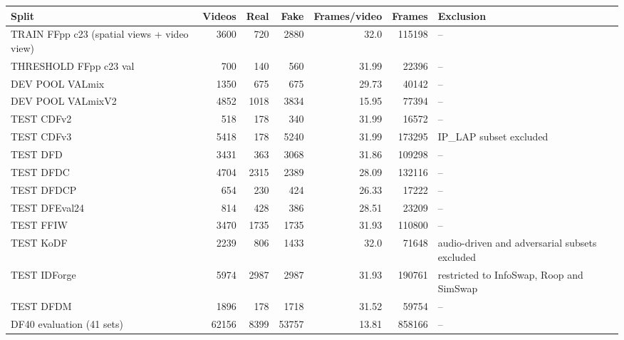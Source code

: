 \begin{tabular}{lrrrrrl}
\toprule
Split & Videos & Real & Fake & Frames/video & Frames & Exclusion \\
\midrule
TRAIN FFpp c23 (spatial views + video view) & 3600 & 720 & 2880 & 32.0 & 115198 & -- \\
THRESHOLD FFpp c23 val & 700 & 140 & 560 & 31.99 & 22396 & -- \\
DEV POOL VALmix & 1350 & 675 & 675 & 29.73 & 40142 & -- \\
DEV POOL VALmixV2 & 4852 & 1018 & 3834 & 15.95 & 77394 & -- \\
TEST CDFv2 & 518 & 178 & 340 & 31.99 & 16572 & -- \\
TEST CDFv3 & 5418 & 178 & 5240 & 31.99 & 173295 & IP_LAP subset excluded \\
TEST DFD & 3431 & 363 & 3068 & 31.86 & 109298 & -- \\
TEST DFDC & 4704 & 2315 & 2389 & 28.09 & 132116 & -- \\
TEST DFDCP & 654 & 230 & 424 & 26.33 & 17222 & -- \\
TEST DFEval24 & 814 & 428 & 386 & 28.51 & 23209 & -- \\
TEST FFIW & 3470 & 1735 & 1735 & 31.93 & 110800 & -- \\
TEST KoDF & 2239 & 806 & 1433 & 32.0 & 71648 & audio-driven and adversarial subsets excluded \\
TEST IDForge & 5974 & 2987 & 2987 & 31.93 & 190761 & restricted to InfoSwap, Roop and SimSwap \\
TEST DFDM & 1896 & 178 & 1718 & 31.52 & 59754 & -- \\
DF40 evaluation (41 sets) & 62156 & 8399 & 53757 & 13.81 & 858166 & -- \\
\bottomrule
\end{tabular}
